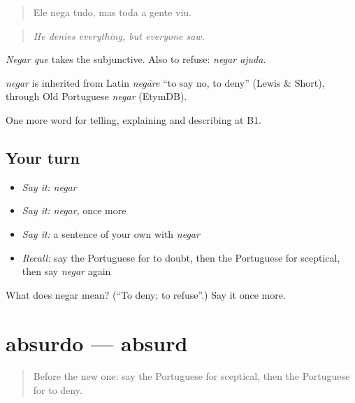 \begin{quote}
Ele nega tudo, mas toda a gente viu.
\end{quote}

\begin{quote}
\emph{He denies everything, but everyone saw.}
\end{quote}

\emph{Negar que} takes the subjunctive. Also to refuse: \emph{negar ajuda}.

\begin{cousinweb}
\emph{negar} is inherited from Latin \emph{negāre} \textquotedblleft{}to say no, to deny\textquotedblright{} (Lewis \& Short), through Old Portuguese \emph{negar} (EtymDB).
\end{cousinweb}

\begin{grammarlens}[title={What you've built}]
One more word for telling, explaining and describing at B1.
\end{grammarlens}

\subsection*{Your turn}
\begin{itemize}
\raggedright
  \item \emph{Say it:} \emph{negar}
  \item \emph{Say it:} \emph{negar}, once more
  \item \emph{Say it:} a sentence of your own with \emph{negar}
  \item \emph{Recall:} say the Portuguese for to doubt, then the Portuguese for sceptical, then say \emph{negar} again
\end{itemize}

\begin{tcolorbox}[breakable,colback=teal!4,colframe=teal!35!black,title={Before you move on}]
What does negar mean? (\textquotedblleft{}To deny; to refuse\textquotedblright{}.) Say it once more.
\end{tcolorbox}
\section[absurdo]{absurdo — absurd}

\label{lesson:PT-C340-absurdo}



\begin{quote}
Before the new one: say the Portuguese for sceptical, then the Portuguese for to deny.
\end{quote}

